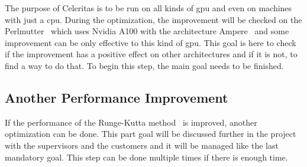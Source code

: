 The purpose of Celeritas is to be run on all kinds of \acrshort{gpu} and even on machines with just a \acrshort{cpu}.
During the optimization, the improvement will be checked on the Perlmutter~\cite{Perlmutter} which uses Nvidia A100 with the architecture Ampere~\cite{ampere} and some improvement can be only effective to this kind of \acrshort{gpu}.
This goal is here to check if the improvement has a positive effect on other architectures and if it is not, to find a way to do that.
To begin this step, the main goal needs to be finished.

\subsection{Another Performance Improvement}
\label{spec:ch:goals:optional-requirements:another-performance-improvement}

If the performance of the Runge-Kutta method~\cite{Runge-Kutta-methods} is improved, another optimization can be done.
This part goal will be discussed further in the project with the supervisors and the customers and it will be managed like the last mandatory goal.
This step can be done multiple times if there is enough time.

